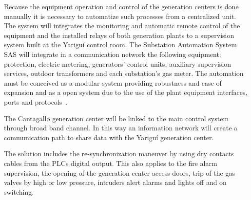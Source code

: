 Because the equipment operation and control of the generation centers
is done manually it is necessary to automatize such processes from a
centralized unit. The system will integrates the monitoring and automatic
remote control of the equipment and the installed relays of both
generation plants to a supervision system built at the Yariguí control
room. The Substation Automation System SAS will integrate in a communication 
network the following equipment: protection, electric metering, generators' 
control units, auxiliary supervision services, outdoor transformers and each
substation's gas meter. The automation must be conceived as a modular
system providing robustness and ease of expansion and as a open system
due to the use of the plant equipment interfaces, ports and
protocols~\cite{neumann:2007}.

The Cantagallo generation center will be linked to the main control system
through broad band channel. In this way an information network will create 
a communication path to share data with the Yariguí generation center.

The solution includes the re-synchronization maneuver by using dry
contacts cables from the PLCs digital output. This also applies to
the fire alarm supervision, the opening of the generation center
access doors, trip of the gas valves by high or low pressure,
intruders alert alarms and lights off and on switching.
